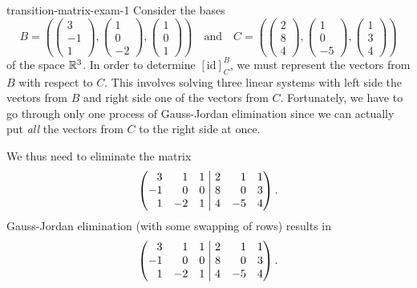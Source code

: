 \begin{example}{}{transition-matrix-exam-1}
 Consider the bases
 \[
  B = \left( 
   \begin{pmatrix}
    3\\-1\\1
   \end{pmatrix},
   \begin{pmatrix}
    1\\0\\-2
   \end{pmatrix},
   \begin{pmatrix}
    1\\0\\1
   \end{pmatrix}
  \right) \quad \text{and} \quad 
  C = \left( 
  \begin{pmatrix}
   2\\8\\4
  \end{pmatrix},
  \begin{pmatrix}
   1\\0\\-5
  \end{pmatrix},
  \begin{pmatrix}
   1\\3\\4
  \end{pmatrix}
  \right)
 \]
 of the space $\mathbb{R}^3$. In order to determine $[\mathrm{id}]_C^{B}$, we must
 represent the vectors from $B$ with respect to $C$. This involves solving three
 linear systems with left side the vectors from $B$ and right side one of the
 vectors from $C$. Fortunately, we have to go through only one process of
 Gauss-Jordan elimination since we can actually put \emph{all} the vectors from
 $C$ to the right side at once.

 We thus need to eliminate the matrix
 \[
  \left(
   \begin{matrix*}[r]
    3 & 1 & 1\\
    -1 & 0 & 0\\
    1 & -2 & 1
   \end{matrix*}
   \hspace{1mm}
  \right|
  \left.
   \begin{matrix*}[r]
    2 & 1 & 1\\
    8 & 0 & 3\\
    4 & -5 & 4
   \end{matrix*}
  \right).
 \]
 Gauss-Jordan elimination (with some swapping of rows) results in
 \[
  \left(
   \begin{matrix*}[r]
    3 & 1 & 1\\
    -1 & 0 & 0\\
    1 & -2 & 1
   \end{matrix*}
   \hspace{1mm}
  \right|
  \left.
   \begin{matrix*}[r]
    2 & 1 & 1\\
    8 & 0 & 3\\
    4 & -5 & 4
   \end{matrix*}
  \right).
 \]
\end{example}
